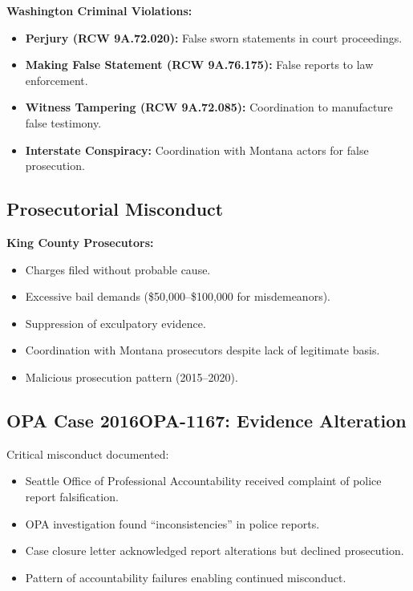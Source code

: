 \documentclass[12pt,oneside]{article}
\begin{document}
\begin{flushleft}
\textbf{Washington Criminal Violations:}

\begin{itemize}
\item \textbf{Perjury (RCW 9A.72.020):} False sworn statements in court proceedings.
\item \textbf{Making False Statement (RCW 9A.76.175):} False reports to law enforcement.
\item \textbf{Witness Tampering (RCW 9A.72.085):} Coordination to manufacture false testimony.
\item \textbf{Interstate Conspiracy:} Coordination with Montana actors for false prosecution.
\end{itemize}

\subsection*{Prosecutorial Misconduct}

\textbf{King County Prosecutors:}

\begin{itemize}
\item Charges filed without probable cause.
\item Excessive bail demands (\$50,000--\$100,000 for misdemeanors).
\item Suppression of exculpatory evidence.
\item Coordination with Montana prosecutors despite lack of legitimate basis.
\item Malicious prosecution pattern (2015--2020).
\end{itemize}

\subsection*{OPA Case 2016OPA-1167: Evidence Alteration}

Critical misconduct documented:

\begin{itemize}
\item Seattle Office of Professional Accountability received complaint of police report falsification.
\item OPA investigation found ``inconsistencies'' in police reports.
\item Case closure letter acknowledged report alterations but declined prosecution.
\item Pattern of accountability failures enabling continued misconduct.
\end{itemize}


\end{flushleft}
\end{document}

